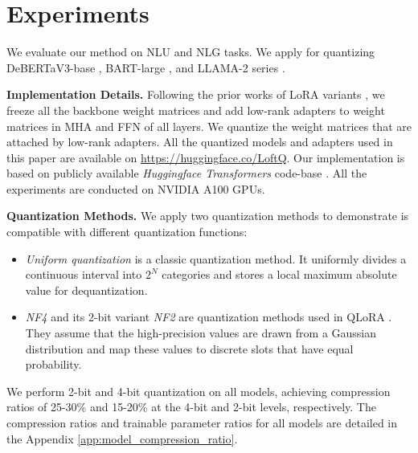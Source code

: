 \section{Experiments}
\label{sec:experiment}
We evaluate our method on NLU and NLG tasks. We apply {\OurAlg} for quantizing DeBERTaV3-base \citep{he2021debertav3}, BART-large \citep{lewis2019bart}, and LLAMA-2 series \citep{touvron2023llama}.

\noindent \textbf{Implementation Details.} Following the prior works of LoRA variants \citep{zhang2023adaptive, he2021towards}, we freeze all the backbone weight matrices and add low-rank adapters to weight matrices in MHA and FFN of all layers. We quantize the weight matrices that are attached by low-rank adapters. All the quantized models and adapters used in this paper are available on \url{https://huggingface.co/LoftQ}.
Our implementation is based on publicly available {\it Huggingface Transformers} code-base \citep{NEURIPS2019_9015}. All the experiments are conducted on NVIDIA A100 GPUs.

\noindent \textbf{Quantization Methods.} We apply two quantization methods to demonstrate {\OurAlg} is compatible with different quantization functions:
\begin{itemize}
    \item \textit{Uniform quantization} is a classic quantization method. It uniformly divides a continuous interval into $2^N$ categories and stores a local maximum absolute value for dequantization.
    \item \textit{NF4} and its 2-bit variant \textit{NF2} are quantization methods used in QLoRA \citep{dettmers2023qlora}. They assume that the high-precision values are drawn from a Gaussian distribution and map these values to discrete slots that have equal probability.
\end{itemize}
We perform 2-bit and 4-bit quantization on all models, achieving compression ratios of 25-30\% and 15-20\% at the 4-bit and 2-bit levels, respectively. The compression ratios and trainable parameter ratios for all models are detailed in the Appendix \ref{app:model_compression_ratio}.

